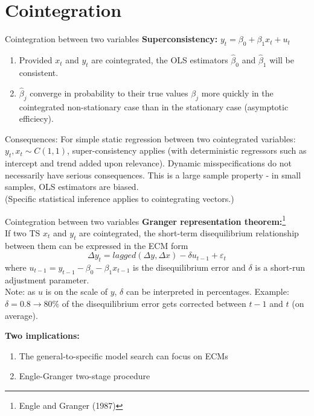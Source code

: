 \documentclass{beamer}
\begin{document}

\section{Cointegration}

\begin{frame}{Cointegration between two variables}
\textbf{Superconsistency:} $y_t =  \beta_0 + \beta_1 x_t + u_t$\\
\begin{enumerate}
\item Provided $x_t$ and $y_t$ are cointegrated, the OLS estimators $\hat{\beta}_0$ and $\hat{\beta}_1$ will be consistent. 
\item $\hat{\beta}_j$ converge in probability to their true values $\beta_j$ more quickly in the cointegrated non-stationary case than in the stationary case (asymptotic efficiecy).
\end{enumerate}
\begin{block}{Consequences:}
For simple static regression between two cointegrated variables: $y_t, x_t \sim C(1,1)$, super-consistency applies (with deterministic regressors such as intercept and trend added upon relevance). Dynamic misspecifications do not necessarily have serious consequences. This is a large sample property - in small samples, OLS estimators are biased.\\ (Specific statistical inference applies to cointegrating vectors.)
\end{block}
\end{frame}


\begin{frame}{Cointegration between two variables}
\textbf{Granger representation theorem:}\footnote{Engle and Granger (1987)}\\
If two TS $x_t$ and $y_t$ are cointegrated, the short-term disequilibrium relationship between them can be expressed in the ECM form
\vspace{-0.2cm}
\begin{equation} \label{eq6}
 \Delta y_t = lagged(\Delta y, \Delta x) - \delta u_{t-1} + \varepsilon_t 
\end{equation}
where $u_{t-1} = y_{t-1} - \beta_0 - \beta_1 x_{t-1}$ is the disequilibrium error and $\delta$ is a short-run adjustment parameter. \\
\footnotesize{Note: as $u$ is on the scale of $y$, $\delta$ can be interpreted in percentages. Example: $\delta = 0.8 \rightarrow 80 \%$ of the disequilibrium error gets corrected between $t-1$ and $t$ (on average).}
\vspace{0.1cm}

\textbf{Two implications:}
\begin{enumerate}
\item The general-to-specific model search can focus on ECMs
\item Engle-Granger two-stage procedure
\end{enumerate}
\end{frame}
\end{document}
